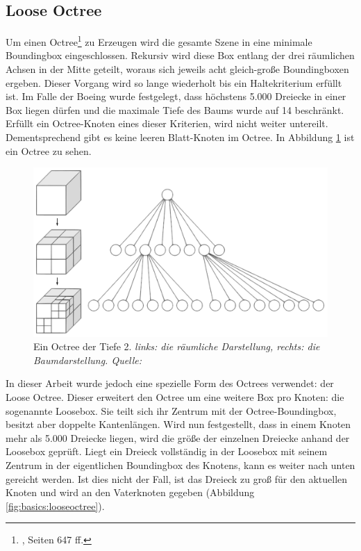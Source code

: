 \subsection{Loose Octree}
\label{sec:basics:octree}
Um einen Octree\footnote{\cite{RTR3}, Seiten 647 ff.} zu Erzeugen wird die gesamte Szene in eine minimale Boundingbox eingeschlossen. Rekursiv wird diese Box entlang der drei räumlichen Achsen in der Mitte geteilt, woraus sich jeweils acht gleich-große Boundingboxen ergeben. Dieser Vorgang wird so lange wiederholt bis ein Haltekriterium erfüllt ist. Im Falle der Boeing wurde festgelegt, dass höchstens 5.000 Dreiecke in einer Box liegen dürfen und die maximale Tiefe des Baums wurde auf 14 beschränkt. Erfüllt ein Octree-Knoten eines dieser Kriterien, wird nicht weiter untereilt. Dementsprechend gibt es keine leeren Blatt-Knoten im Octree. In Abbildung \ref{fig:basics:octree} ist ein Octree zu sehen.\\
\begin{figure}
 \centering
  \includegraphics[scale=0.5]{images/octree.pdf}
  \caption{Ein Octree der Tiefe 2. \textit{links: die räumliche Darstellung, rechts: die Baumdarstellung. Quelle: }}
 \label{fig:basics:octree}
\end{figure}
In dieser Arbeit wurde jedoch eine spezielle Form des Octrees verwendet: der Loose Octree. Dieser erweitert den Octree um eine weitere Box pro Knoten: die sogenannte Loosebox. Sie teilt sich ihr Zentrum mit der Octree-Boundingbox, besitzt aber doppelte Kantenlängen. Wird nun festgestellt, dass in einem Knoten mehr als 5.000 Dreiecke liegen, wird die größe der einzelnen Dreiecke anhand der Loosebox geprüft. Liegt ein Dreieck vollständig in der Loosebox mit seinem Zentrum in der eigentlichen Boundingbox des Knotens, kann es weiter nach unten gereicht werden. Ist dies nicht der Fall, ist das Dreieck zu groß für den aktuellen Knoten und wird an den Vaterknoten gegeben (Abbildung \ref{fig:basics:looseoctree}).\\
